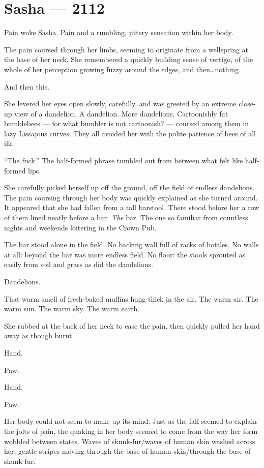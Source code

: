 \hypertarget{sasha-2112}{%
\chapter*{Sasha — 2112}\label{sasha-2112}}

Pain woke Sasha. Pain and a rumbling, jittery sensation within her body.

The pain coursed through her limbs, seeming to originate from a wellspring at the base of her neck. She remembered a quickly building sense of vertigo, of the whole of her perception growing fuzzy around the edges, and then\ldots{}nothing.

And then this.

She levered her eyes open slowly, carefully, and was greeted by an extreme close-up view of a dandelion. A dandelion. More dandelions. Cartoonishly fat bumblebees — for what bumbler is not cartoonish? — coursed among them in lazy Lissajous curves. They all avoided her with the polite patience of bees of all ilk.

``The fuck.'' The half-formed phrase tumbled out from between what felt like half-formed lips.

She carefully picked herself up off the ground, off the field of endless dandelions. The pain coursing through her body was quickly explained as she turned around. It appeared that she had fallen from a tall barstool. There stood before her a row of them lined neatly before a bar. \emph{The} bar. The one so familiar from countless nights and weekends loitering in the Crown Pub.

The bar stood alone in the field. No backing wall full of racks of bottles. No walls at all: beyond the bar was more endless field. No floor: the stools sprouted as easily from soil and grass as did the dandelions.

Dandelions.

That warm smell of fresh-baked muffins hung thick in the air. The warm air. The warm sun. The warm sky. The warm earth.

She rubbed at the back of her neck to ease the pain, then quickly pulled her hand away as though burnt.

Hand.

Paw.

Hand.

Paw.

Her body could not seem to make up its mind. Just as the fall seemed to explain the jolts of pain, the quaking in her body seemed to come from the way her form wobbled between states. Waves of skunk-fur/waves of human skin washed across her, gentle stripes moving through the base of human skin/through the base of skunk fur.

